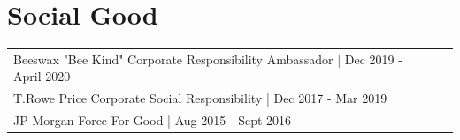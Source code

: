 \documentclass[a4paper]{deedy-resume-openfont} %
\begin{document}
\begin{minipage}[t]{0.66\textwidth}







\sectionspace %


\section{Social Good}
 \begin{tabular}{lll}
 Beeswax "Bee Kind" Corporate Responsibility Ambassador | Dec 2019 - April 2020 \\
 T.Rowe Price Corporate Social Responsibility | Dec 2017 - Mar 2019 \\
 JP Morgan Force For Good | Aug 2015 - Sept 2016 \\
\end{tabular}





\end{minipage} %
\end{document}
